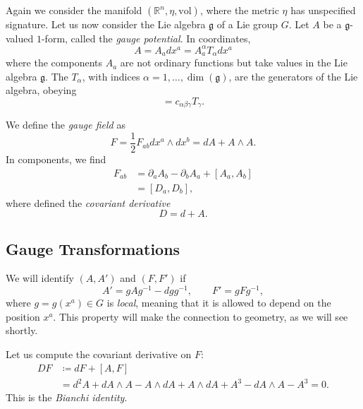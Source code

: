 Again we consider the manifold $(\mathbb{R}^n, \eta, \text{vol})$, where the metric $\eta$ has unspecified signature.
Let us now consider the Lie algebra $\mathfrak{g}$ of a Lie group $G$.
Let $A$ be a $\mathfrak{g}$-valued $1$-form, called the \emph{gauge potential}.
In coordinates,
\begin{equation}
  A = A_a dx^{a} = A_a^{\alpha} T_{\alpha} dx^{a}
\end{equation}
where the components $A_a$ are not ordinary functions but take values in the Lie algebra $\mathfrak{g}$.
The $T_{\alpha}$, with indices $\alpha = 1, \dots, \dim(\mathfrak{g})$, are the generators of the Lie algebra, obeying
\begin{equation}
  [T_{\alpha}, T_{\beta}] = c_{\alpha\beta\gamma} T_{\gamma}.
\end{equation}
\begin{definition}
  We define the \emph{gauge field} as 
  \begin{equation}
    F = \frac{1}{2} F_{ab} dx^{a} \wedge dx^{b} = \boxed{dA + A \wedge A}.
  \end{equation}
  In components, we find
  \begin{align}
    F_{ab} &= \partial_{a} A_{b} - \partial_{b} A_{a} + [A_{a}, A_{b}] \\
    &= [D_a, D_b],
  \end{align}
  where defined the \emph{covariant derivative}
  \begin{equation}
    D = d + A.
  \end{equation}
\end{definition}

\subsection{Gauge Transformations}%
\label{sub:gauge_transformations}

We will identify $(A, A')$ and $(F, F')$ if
\begin{equation}
  \label{eq:12-gauge-transformation}
  A' = g A g^{-1} - d g g^{-1}, \qquad F' = g F g^{-1},
\end{equation}
where $g = g(x^{a}) \in G$ is \emph{local}, meaning that it is allowed to depend on the position $x^{a}$.
This property will make the connection to geometry, as we will see shortly.

Let us compute the covariant derivative on $F$:
\begin{align}
  D F &\coloneqq d F + [A, F] \\
  &= d^2 A + dA \wedge A - A \wedge d A + A \wedge d A + A^3 - dA \wedge A - A^3 = 0.
\end{align}
This is the \emph{Bianchi identity}.

